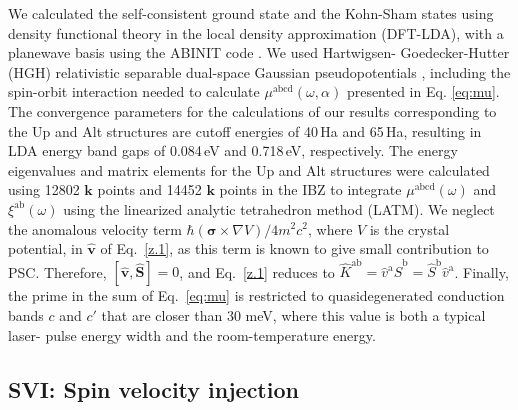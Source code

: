\documentclass[floatfix,prb,aps,superscriptaddress,showpacs,11pt,preprint,letterpaper]{revtex4}
\begin{document}
We calculated the self-consistent ground state and the Kohn-Sham states using
density functional theory in the local density approximation (DFT-LDA), with a
planewave basis using the ABINIT code \cite{gonzeCPC09}. We used Hartwigsen-
Goedecker-Hutter (HGH) relativistic separable dual-space Gaussian
pseudopotentials \cite{hartwigsenPRB98}, including the spin-orbit interaction
needed to calculate $\mu^{\mathrm{abcd}}(\omega,\alpha)$ presented in Eq.
\eqref{eq:mu}. The convergence parameters for the calculations of our results
corresponding to the Up and Alt structures are cutoff energies of 40\,Ha and
65\,Ha, resulting in LDA energy band gaps of 0.084\,eV and 0.718\,eV,
respectively. The energy eigenvalues and matrix elements for the Up and Alt
structures were calculated using 12802 ${\mathbf k}$ points and 14452 ${\mathbf
k}$ points in the IBZ to integrate $\mu^{\mathrm{abcd}}(\omega)$ and
$\xi^{\mathrm{a}\mathrm{b}}(\omega)$ using the linearized analytic tetrahedron
method (LATM).\cite{nastosPRB07} We neglect the anomalous velocity term
$\hbar(\boldsymbol{\sigma}\times\nabla V)/4m^2c^2$, where $V$ is the crystal
potential, in $\hat{\mathbf v}$ of Eq.~\eqref{z.1}, as this term is known to
give small contribution to PSC.\cite{bhatPRL05} Therefore, $[\hat{\mathbf
v},\hat{\mathbf S}]=0$, and Eq.~\eqref{z.1} reduces to $\hat
K^{\mathrm{a}\mathrm{b}}=\hat v^\mathrm{a} \hat S^\mathrm{b}=\hat S^\mathrm{b}
\hat v^\mathrm{a}$. Finally, the prime in the sum of Eq.~\eqref{eq:mu} is
restricted to quasidegenerated conduction bands $c$ and $c'$ that are closer
than 30 meV, where this value is both a typical laser- pulse energy width and
the room-temperature energy.\cite{nastosPRB07}


\subsection{SVI: Spin velocity injection} %
\label{sec:res-spin_velocity}
\end{document}
